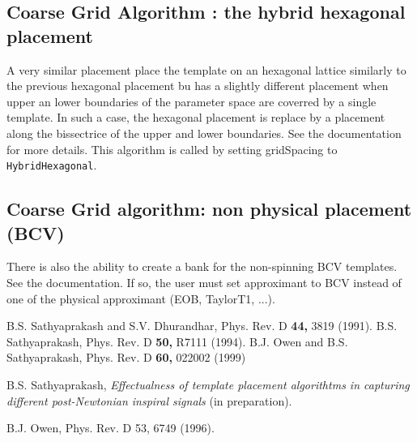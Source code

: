 \subsection{Coarse Grid Algorithm : the hybrid hexagonal placement}
A very similar placement place the template on an hexagonal lattice similarly
to the previous hexagonal placement bu has a slightly different placement when
upper an lower boundaries of the parameter space are coverred by a single
template. In such a case, the hexagonal placement is replace by a placement
along the bissectrice of the upper and lower boundaries. See the documentation
for more details. This algorithm is called by setting gridSpacing to  \texttt{HybridHexagonal}.

\subsection{Coarse Grid algorithm: non physical placement (BCV)}
There is also the ability to create a bank for the non-spinning BCV templates.
See the documentation. If so, the user must set approximant to BCV instead of
one of the physical approximant (EOB, TaylorT1, ...).

\newpage

\begin{thebibliography}{}
 B.S. Sathyaprakash and 
S.V. Dhurandhar, Phys. Rev. D {\bf 44,} 3819 (1991).
 B.S. Sathyaprakash, Phys. Rev. D {\bf 50,} R7111
(1994).
 B.J. Owen and B.S. Sathyaprakash, 
Phys. Rev. D {\bf 60,} 022002 (1999)

 B.S. Sathyaprakash, {\it Effectualness of
template placement algorithtms in capturing different post-Newtonian
inspiral signals} (in preparation).

 B.J. Owen, Phys. Rev. D 53, 6749 (1996).
\end{thebibliography}

